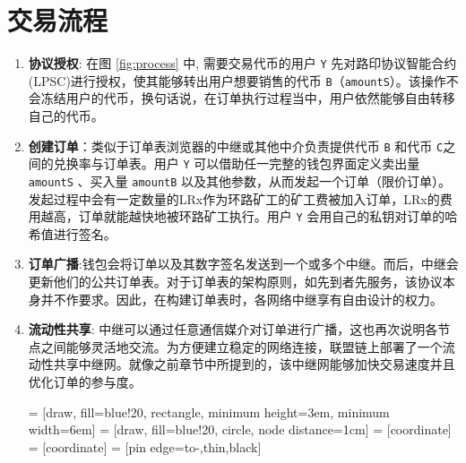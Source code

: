 \documentclass[UTF8]{ctexart}
\makeatletter
\newenvironment{figurehere}
 {\def\@captype{figure}}
 {}
\makeatother
\begin{document}
\begin{multicols}{2}
\begin{itemize}
\end{itemize}


\section{交易流程\label{sec:process}}



\begin{enumerate} 


\item \textbf{协议授权}: 在图 \ref{fig:process} 中, 需要交易代币的用户 \verb|Y| 先对路印协议智能合约(LPSC)进行授权，使其能够转出用户想要销售的代币 \verb|B|（\verb|amountS|）。该操作不会冻结用户的代币，换句话说，在订单执行过程当中，用户依然能够自由转移自己的代币。
\item \textbf{创建订单}：类似于订单表浏览器的中继或其他中介负责提供代币 \verb|B| 和代币 \verb|C|之间的兑换率与订单表。用户 \verb|Y| 可以借助任一完整的钱包界面定义卖出量 \verb|amountS| 、买入量 \verb|amountB| 以及其他参数，从而发起一个订单（限价订单）。发起过程中会有一定数量的LRx作为环路矿工的矿工费被加入订单，LRx的费用越高，订单就能越快地被环路矿工执行。用户 \verb|Y| 会用自己的私钥对订单的哈希值进行签名。

\item \textbf{订单广播}:钱包会将订单以及其数字签名发送到一个或多个中继。而后，中继会更新他们的公共订单表。对于订单表的架构原则，如先到者先服务，该协议本身并不作要求。因此，在构建订单表时，各网络中继享有自由设计的权力。

\item \textbf{流动性共享}: 中继可以通过任意通信媒介对订单进行广播，这也再次说明各节点之间能够灵活地交流。为方便建立稳定的网络连接，联盟链上部署了一个流动性共享中继网。就像之前章节中所提到的，该中继网能够加快交易速度并且优化订单的参与度。
\begin{center}
\begin{figurehere}
\centering
{} = [draw, fill=blue!20, rectangle, 
    minimum height=3em, minimum width=6em]
 = [draw, fill=blue!20, circle, node distance=1cm]
 = [coordinate]
 = [coordinate]
 = [pin edge={to-,thin,black}]

\begin{tikzpicture}[
    auto, 
    scale=0.7,
    node distance=2cm,
    >=latex',
    font=\normalfont,
    order/.style={
		rectangle,
		scale=0.7,
		rounded corners,
		draw=black, 
		text centered,
		minimum height=12mm,
		minimum width=30mm,
		fill=white
	},
	role/.style={
		circle,
		scale=0.7,
		draw=black, 
		text centered,
		minimum height=12mm,
		minimum width=12mm,
		fill=white
	},
	steps/.style={
		circle,
		scale=0.7,
		draw=black, 
		text centered,
		fill=black,
		text=white
	},
	account/.style={
		circle,
		scale=0.7,
		draw=black, 
		text centered,
		minimum height=16mm,
		minimum width=16mm,
		fill=white
	},
	label/.style={
	  scale=0.7
    }
  ]


\end{tikzpicture}
\end{figurehere}
\end{center}
\end{enumerate}
\end{multicols}
\end{document}
